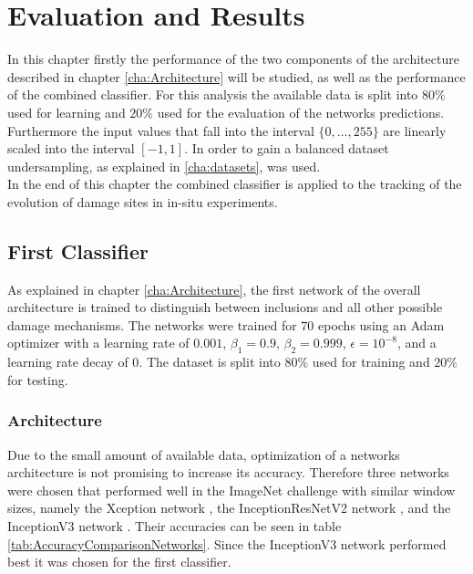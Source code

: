 
\chapter{Evaluation and Results} %

\label{Performance} %

In this chapter firstly the performance of the two components of the architecture described in chapter \ref{cha:Architecture} will be studied, as well as the performance of the combined classifier. For this analysis the available data is split into $80\% $ used for learning and $20\% $ used for the evaluation of the networks predictions. Furthermore the input values that fall into the interval $\{ 0, \dots , 255\}$ are linearly scaled into the interval $[-1,1]$. In order to gain a balanced dataset undersampling, as explained in \ref{cha:datasets}, was used. \\

In the end of this chapter the combined classifier is applied to the tracking of the evolution of damage sites in in-situ experiments.


\section{First Classifier}

As explained in chapter \ref{cha:Architecture}, the first network of the overall architecture is trained to distinguish between inclusions and all other possible damage mechanisms. The networks were trained for $70$ epochs using an Adam optimizer with a learning rate of $0.001$, $\beta_1=0.9$, $\beta_2=0.999$, $\epsilon=10^{-8}$, and a learning rate decay of $0$. The dataset is split into $80\%$ used for training and $20\%$ for testing. 

\subsection{Architecture}
Due to the small amount of available data, optimization of a networks architecture is not promising to increase its accuracy. Therefore three networks were chosen that performed well in the ImageNet challenge with similar window sizes, namely the Xception network \cite{Xception}, the InceptionResNetV2 network \cite{InceptionResNetV2}, and the InceptionV3 network \cite{InceptionV3}. Their accuracies can be seen in table \ref{tab:AccuracyComparisonNetworks}. Since the InceptionV3 network performed best it was chosen for the first classifier.\\

